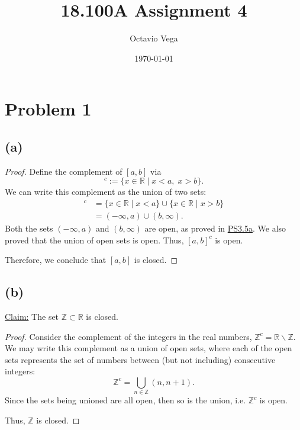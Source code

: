 \documentclass{article}
\title{18.100A Assignment 4}
\author{Octavio Vega}
\date\today
\begin{document}
\maketitle

\section*{Problem 1}
\subsection*{(a)}
\begin{proof}
	Define the complement of $[a,b]$ via
	\begin{equation}
		[a,b]^c := \{x\in\mathbb{R} \;|\; x<a, \; x>b\}.
	\end{equation}
	We can write this complement as the union of two sets:
	\begin{align}
		[a,b]^c &= \{x\in\mathbb{R} \;|\; x<a \} \cup \{x\in\mathbb{R} \;|\; x>b \} \\
		&= (-\infty, a) \cup (b, \infty).
	\end{align}
	Both the sets $(-\infty, a)$ and $(b, \infty)$ are open, as proved in \href{https://github.com/ovega14/RealAnalysis_solutions/blob/main/PS3/18.100A_ps3.pdf}{PS3.5a}. We also proved that the union of open sets is open. Thus, $[a,b]^c$ is open.
	
	Therefore, we conclude that $[a,b]$ is closed.
\end{proof}

\subsection*{(b)}
\underline{Claim:} The set $\mathbb{Z}\subset\mathbb{R}$ is closed.
\begin{proof}
	Consider the complement of the integers in the real numbers, $\mathbb{Z}^c = \mathbb{R}\backslash\mathbb{Z}$. We may write this complement as a union of open sets, where each of the open sets represents the set of numbers between (but not including) consecutive integers:
	\begin{equation}
		\mathbb{Z}^c = \bigcup\limits_{n\in\mathbb{Z}}(n, n+1).
	\end{equation}
	Since the sets being unioned are all open, then so is the union, i.e. $\mathbb{Z}^c$ is open.
	
	Thus, $\mathbb{Z}$ is closed.
\end{proof}
\end{document}

